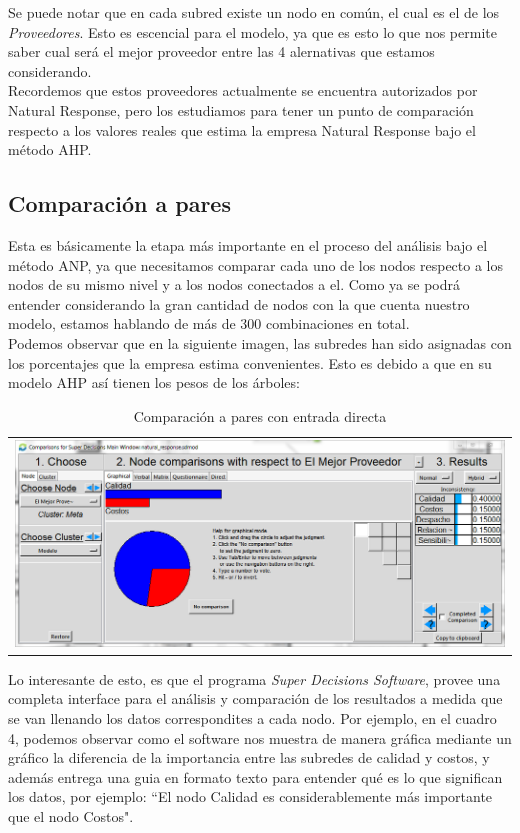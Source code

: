 \documentclass[12pt,letterpaper]{article}
\begin{document}
Se puede notar que en cada subred existe un nodo en común, el cual es el de los \textit{Proveedores}. Esto es escencial para el modelo, ya que es esto lo que nos permite saber cual será el mejor proveedor entre las 4 alernativas que estamos considerando.\\
Recordemos que estos proveedores actualmente se encuentra autorizados por Natural Response, pero los estudiamos para tener un punto de comparación respecto a los valores reales que estima la empresa Natural Response bajo el método AHP.
\newpage
\subsection{Comparación a pares}
Esta es básicamente la etapa más importante en el proceso del análisis bajo el método ANP, ya que necesitamos comparar cada uno de los nodos respecto a los nodos de su mismo nivel y a los nodos conectados a el. Como ya se podrá entender considerando la gran cantidad de nodos con la que cuenta nuestro modelo, estamos hablando de más de 300 combinaciones en total.\\

Podemos observar que en la siguiente imagen, las subredes han sido asignadas con los porcentajes que la empresa estima convenientes. Esto es debido a que en su modelo AHP así tienen los pesos de los árboles:

\begin{table}[h]
\centering
\begin{tabular}{c}
\includegraphics[width=\textwidth]{img/3.PNG}
\end{tabular}
\caption{Comparación a pares con entrada directa}
\label{tab:comparacion entrada directa}
\end{table}

Lo interesante de esto, es que el programa \textit{Super Decisions Software}, provee una completa interface para el análisis y comparación de los resultados a medida que se van llenando los datos correspondites a cada nodo. Por ejemplo, en el cuadro 4, podemos observar como el software nos muestra de manera gráfica mediante un gráfico la diferencia de la importancia entre las subredes de calidad y costos, y además entrega una guia en formato texto para entender qué es lo que significan los datos, por ejemplo: ``El nodo Calidad es considerablemente más importante que el nodo Costos".
\end{document}
